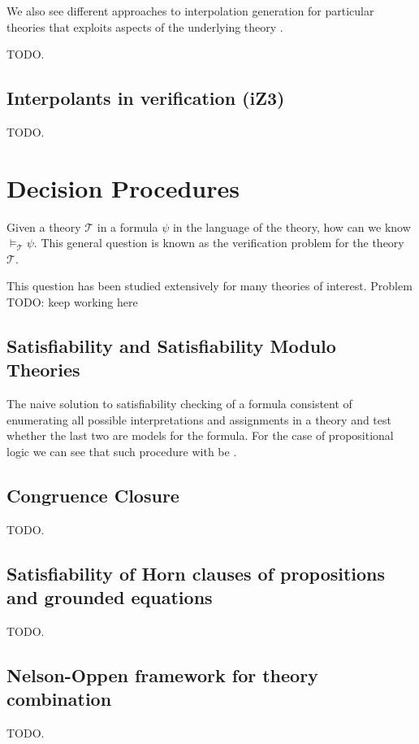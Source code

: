 We also see different approaches to interpolation generation for particular
theories that exploits aspects of the underlying theory
\cite{10.1007/978-3-540-69738-1_25, 10.1007/11814771_21}.

TODO.

\subsection{Interpolants in verification (iZ3)}


TODO.

\section{Decision Procedures}

Given a theory $\mathcal{T}$ in a formula $\psi$ in the language of the theory, how can we know $\models_{\mathcal{T}} \psi$. This general question is known as the verification problem for the theory $\mathcal{T}$.

This question has been studied extensively for many theories of interest. Problem TODO: keep working here

\subsection{Satisfiability and Satisfiability Modulo Theories}
 
The naive solution to satisfiability checking of a formula
consistent of enumerating all possible interpretations 
and assignments in a theory and test whether the last two are 
models for the formula. For the case of propositional logic 
we can see that such procedure with be .

\subsection{Congruence Closure}

TODO.

\subsection{Satisfiability of Horn clauses of propositions and grounded equations}

TODO.

\subsection{Nelson-Oppen framework for theory combination}


TODO.


